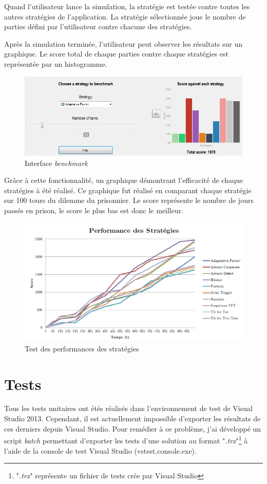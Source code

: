 \documentclass[a4paper, french]{article}
\begin{document}
Quand l'utilisateur lance la simulation, la stratégie est testée contre toutes les autres stratégies de l'application. La stratégie sélectionnée joue le nombre de parties défini par l'utilisateur contre chacune des stratégies.

Après la simulation terminée, l'utilisateur peut observer les résultats sur un graphique. Le score total de chaque parties contre chaque stratégies est représentée par un histogramme.

\begin{figure}[htp]
    \centering
    \includegraphics[width=\linewidth - 3cm]{benchmark_gui.png}
    \caption{Interface \textit{benchmark}}
\end{figure}

Grâce à cette fonctionnalité, un graphique démontrant l'efficacité de chaque stratégies à été réalisé. Ce graphique fut réalisé en comparant chaque stratégie sur 100 tours du dilemme du prisonnier. Le score représente le nombre de jours passés en prison, le score le plus bas est donc le meilleur.

\begin{figure}[htp]
    \centering
    \includegraphics[width=\linewidth - 3cm]{benchmark.png}
    \caption{Test des performances des stratégies}
\end{figure}

\pagebreak
\section{Tests}
Tous les tests unitaires ont étés réalisés dans l'environnement de test de Visual Studio 2013. Cependant, il est actuellement impossible d'exporter les résultats de ces derniers depuis Visual Studio. Pour remédier à ce problème, j'ai développé un script \textit{batch} permettant d'exporter les tests d'une solution au format "\textit{.trx}"\footnote{"\textit{.trx}" représente un fichier de tests crée par Visual Studio} à l'aide de la console de test Visual Studio (vstest.console.exe).
\end{document}
